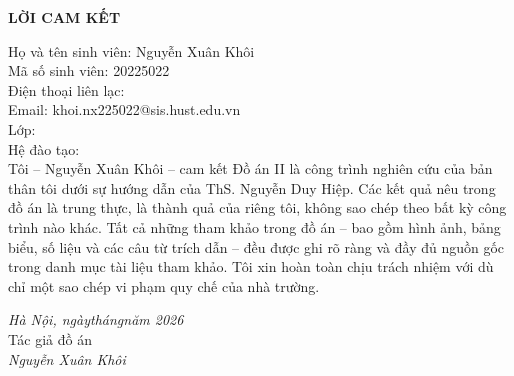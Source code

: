 \thispagestyle{empty}
\begin{center}
{\Large\bfseries LỜI CAM KẾT}
\end{center}
\vspace{0.8cm}

\noindent Họ và tên sinh viên: Nguyễn Xuân Khôi \dotfill{}\\[0.4cm]
\noindent Mã số sinh viên: 20225022 \dotfill{}\\[0.4cm]
\noindent Điện thoại liên lạc: \dotfill{}\\[0.4cm]
\noindent Email: khoi.nx225022@sis.hust.edu.vn \dotfill{}\\[0.4cm]
\noindent Lớp: \dotfill{}\\[0.4cm]
\noindent Hệ đào tạo: \dotfill{}\\[1.0cm]

Tôi -- Nguyễn Xuân Khôi -- cam kết Đồ án II là công trình nghiên cứu của bản thân
tôi dưới sự hướng dẫn của ThS. Nguyễn Duy Hiệp. Các kết quả nêu trong đồ án là
trung thực, là thành quả của riêng tôi, không sao chép theo bất kỳ công trình nào
khác. Tất cả những tham khảo trong đồ án -- bao gồm hình ảnh, bảng biểu, số liệu
và các câu từ trích dẫn -- đều được ghi rõ ràng và đầy đủ nguồn gốc trong danh
mục tài liệu tham khảo. Tôi xin hoàn toàn chịu trách nhiệm với dù chỉ một sao
chép vi phạm quy chế của nhà trường.

\vspace{1.0cm}
\begin{flushright}
\textit{Hà Nội, ngày\quad tháng\quad năm 2026}\\[0.3cm]
Tác giả đồ án\\[1.5cm]
\textit{Nguyễn Xuân Khôi}
\end{flushright}
